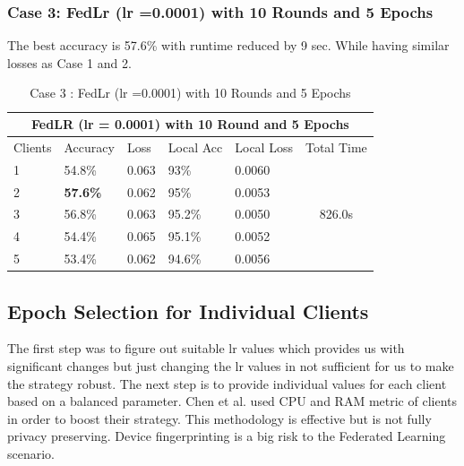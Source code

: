 \documentclass[conference]{IEEEtran}
\begin{document}
 \subsubsection{Case 3: FedLr (lr =0.0001) with 10 Rounds and 5 Epochs}
The best accuracy is 57.6\% with runtime reduced by 9 sec. While having similar losses as Case 1 and 2.
 \begin{table}[ht]
 	\centering
 	\caption{Case 3 : FedLr (lr =0.0001) with 10 Rounds and 5 Epochs}
 		\begin{tabular}{|lllllc|}
 			\hline
 			\multicolumn{6}{|c|}{FedLR (lr = 0.0001) with 10 Round and 5 Epochs}                                                                                                                            \\ \hline
 			\multicolumn{1}{|l|}{Clients} & \multicolumn{1}{l|}{Accuracy} & \multicolumn{1}{l|}{Loss}  & \multicolumn{1}{l|}{Local Acc} & \multicolumn{1}{l|}{Local Loss} & \multicolumn{1}{l|}{Total Time} \\ \hline
 			\multicolumn{1}{|l|}{1}       & \multicolumn{1}{l|}{54.8\%}   & \multicolumn{1}{l|}{0.063} & \multicolumn{1}{l|}{93\%}      & \multicolumn{1}{l|}{0.0060}     & \multirow{5}{*}{826.0s}         \\ \cline{1-5}
 			\multicolumn{1}{|l|}{2}       & \multicolumn{1}{l|}{\textbf{57.6\%}}   & \multicolumn{1}{l|}{0.062} & \multicolumn{1}{l|}{95\%}      & \multicolumn{1}{l|}{0.0053}     &                                 \\ \cline{1-5}
 			\multicolumn{1}{|l|}{3}       & \multicolumn{1}{l|}{56.8\%}   & \multicolumn{1}{l|}{0.063} & \multicolumn{1}{l|}{95.2\%}    & \multicolumn{1}{l|}{0.0050}     &                                 \\ \cline{1-5}
 			\multicolumn{1}{|l|}{4}       & \multicolumn{1}{l|}{54.4\%}   & \multicolumn{1}{l|}{0.065} & \multicolumn{1}{l|}{95.1\%}    & \multicolumn{1}{l|}{0.0052}     &                                 \\ \cline{1-5}
 			\multicolumn{1}{|l|}{5}       & \multicolumn{1}{l|}{53.4\%}   & \multicolumn{1}{l|}{0.062} & \multicolumn{1}{l|}{94.6\%}    & \multicolumn{1}{l|}{0.0056}     &                                 \\ \hline
 		\end{tabular}%
 \end{table}

\subsection{Epoch Selection for Individual Clients}
The first step was to figure out suitable lr values which provides us with significant changes but just changing the lr values in not sufficient for us to make the strategy robust. The next step is to provide individual values for each client based on a balanced parameter. Chen et al. \cite{chen2023boosting} used CPU and RAM metric of clients in order to boost their strategy. This methodology is effective but is not fully privacy preserving. Device fingerprinting is a big risk to the Federated Learning scenario. 
\end{document}
